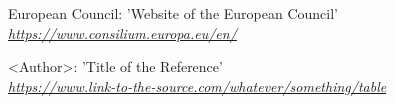\documentclass{guide-ethmun}
\newcommand{\quelle}[1]{\textit{\href{#1}{#1}}} %
\begin{document}



\begin{thebibliography}{\hspace{1cm}}
European Council: 'Website of the European Council' \\
\quelle{https://www.consilium.europa.eu/en/}
\newline

<Author>: 'Title of the Reference' \\
\quelle{https://www.link-to-the-source.com/whatever/something/table}

\end{thebibliography}
\end{document}
